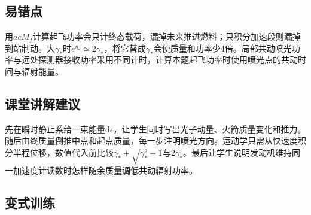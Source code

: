 \documentclass[UTF8,fontset=fandol,a4paper,11pt]{ctexart}
\begin{document}


\subsection*{易错点}

用$acM_f$计算起飞功率会只计终态载荷，漏掉未来推进燃料；只积分加速段则漏掉到站制动。大$\gamma_*$时$e^{\eta_*}\simeq2\gamma_*$，将它替成$\gamma_*$会使质量和功率少4倍。局部共动喷光功率与远处探测器接收功率采用不同计时，计算本题起飞功率时使用喷光点的共动时间与辐射能量。



\subsection*{课堂讲解建议}

先在瞬时静止系给一束能量$\mathrm d\epsilon$，让学生同时写出光子动量、火箭质量变化和推力。随后由终质量倒推中点和起点质量，每一步注明喷光方向。运动学只需从快速度积分半程位移，数值代入前比较$\gamma_*+\sqrt{\gamma_*^2-1}$与$2\gamma_*$。最后让学生说明发动机维持同一加速度计读数时怎样随余质量调低共动辐射功率。



\subsection*{变式训练}
\end{document}
